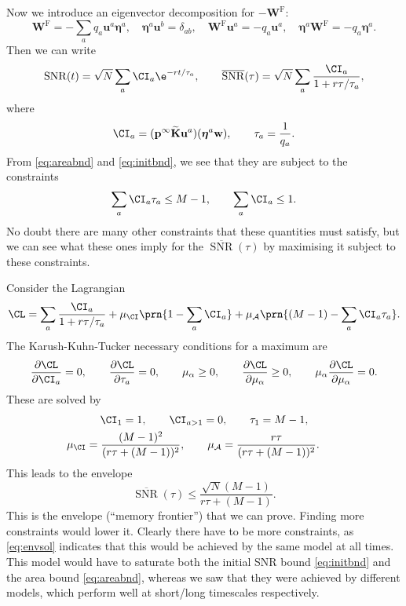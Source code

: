\documentclass[12pt]{article}
\newcommand{\pr}{\mathbf{p}}
\newcommand{\eq}{\pr^\infty}
\newcommand{\w}{\mathbf{w}}
\newcommand{\W}{\mathbf{W}}
\newcommand{\enc}{\mathbf{K}}
\newcommand{\frg}{\W^{\mathrm{F}}}
\newcommand{\ench}{\widetilde{\enc}}
\newcommand{\evr}{\mathbf{u}}
\newcommand{\evl}{\boldsymbol{\eta}}
\DeclareMathOperator{\snr}{SNR}
\newcommand{\snrb}{\overline{\snr}}
\newcommand{\CA}{\mathcal{A}}
\renewcommand{\pdiff}[2]{\frac{\partial #1}{\partial #2}}
\begin{document}
Now we introduce an eigenvector decomposition for $-\frg$:
%
\begin{equation}\label{eq:eigendecomp}
  \frg = - \sum_a q_a \evr^a \evl^a,
  \quad
  \evl^a \evr^b = \delta_{ab},
  \quad
  \frg \evr^a = -q_a \evr^a,
  \quad
  \evl^a \frg = -q_a \evl^a.
\end{equation}
%
Then we can write
%
\begin{equation}\label{eqsnreig}
  \snr(t) = \sqrt{N}\sum_a \CI_a \e^{-rt/\tau_a},
  \qquad
  \snrb(\tau) = \sqrt{N}\sum_a \frac{\CI_a}{1+r\tau/\tau_a},
\end{equation}
%
where
%
\begin{equation}\label{eq:snrcoeffs}
  \CI_a = (\eq \ench \evr^a) (\evl^a \w),
  \qquad
  \tau_a = \frac{1}{q_a}.
\end{equation}
%
From \eqref{eq:areabnd} and \eqref{eq:initbnd}, we see that they are subject to the constraints
%
\begin{equation}\label{eq:coeffconstr}
  \sum_a \CI_a \tau_a \leq M-1,
  \qquad
  \sum_a \CI_a \leq 1.
\end{equation}
%
No doubt there are many other constraints that these quantities must satisfy, but we can see what these ones imply for the $\snrb(\tau)$ by maximising it subject to these constraints.

Consider the Lagrangian
%
\begin{equation}\label{eq:envlagrangian}
  \CL = \sum_a \frac{\CI_a}{1+r\tau/\tau_a} + \mu_\CI \prn{1 - \sum_a \CI_a} + \mu_\CA \prn{(M-1) - \sum_a \CI_a \tau_a}.
\end{equation}
%
The Karush-Kuhn-Tucker necessary conditions for a maximum are
%
\begin{equation}\label{eq:envKTcond}
  \pdiff{\CL}{\CI_a} = 0, \qquad
  \pdiff{\CL}{\tau_a} = 0, \qquad
  \mu_\alpha \geq 0, \qquad
  \pdiff{\CL}{\mu_\alpha} \geq 0, \qquad
  \mu_\alpha\pdiff{\CL}{\mu_\alpha} = 0.
\end{equation}
%
These are solved by
%
\begin{equation}\label{eq:envsol}
\begin{gathered}
  \CI_1 = 1, \qquad
  \CI_{a>1} = 0, \qquad
  \tau_1 = M-1, \\
  \mu_\CI = \frac{(M-1)^2}{(r\tau + (M-1))^2}, \qquad
  \mu_\CA = \frac{r\tau}{(r\tau+(M-1))^2}. \qquad
\end{gathered}
\end{equation}
%
This leads to the envelope
%
\begin{equation}\label{eq:env}
  \snrb(\tau) \leq \frac{\sqrt{N}(M-1)}{r\tau + (M-1)}.
\end{equation}
%
This is the envelope (``memory frontier'') that we can prove.
Finding more constraints would lower it.
Clearly there have to be more constraints, as \eqref{eq:envsol} indicates that this would be achieved by the same model at all times.
This model would have to saturate both the initial SNR bound \eqref{eq:initbnd} and the area bound \eqref{eq:areabnd}, whereas we saw that they were achieved by different models, which perform well at short/long timescales respectively.
\end{document}
